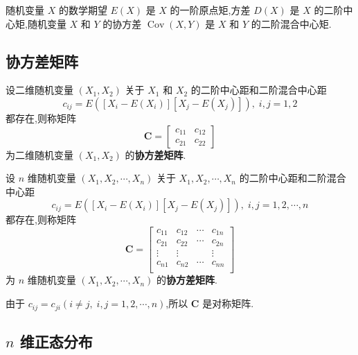 随机变量 $X$ 的数学期望 $E(X)$ 是 $X$ 的一阶原点矩,方差 $D(X)$ 是 $X$ 的二阶中心矩,随机变量 $X$ 和 $Y$ 的协方差 $\operatorname{Cov}(X,Y)$ 是 $X$ 和 $Y$ 的二阶混合中心矩.

\subsection{协方差矩阵}

\begin{definition}
    设二维随机变量 $(X_1,X_2)$ 关于 $X_1$ 和 $X_2$ 的二阶中心距和二阶混合中心距
    $$
    c_{ij} = E([X_i-E(X_i)][X_j-E(X_j)]), \; i,j=1,2
    $$
    都存在,则称矩阵
    $$
    \boldsymbol{C} = \begin{bmatrix}
        c_{11} & c_{12} \\
        c_{21} & c_{22}
    \end{bmatrix}
    $$
    为二维随机变量 $(X_1,X_2)$ 的\textbf{协方差矩阵}.

    设 $n$ 维随机变量 $(X_1,X_2,\cdots,X_n)$ 关于 $X_1,X_2,\cdots,X_n$ 的二阶中心距和二阶混合中心距
    $$
    c_{ij} = E([X_i-E(X_i)][X_j-E(X_j)]), \; i,j=1,2,\cdots,n
    $$
    都存在,则称矩阵
    $$
    \boldsymbol{C} = \begin{bmatrix}
        c_{11} & c_{12} & \cdots & c_{1n} \\
        c_{21} & c_{22} & \cdots & c_{2n} \\
        \vdots & \vdots & & \vdots \\
        c_{n1} & c_{n2} & \cdots & c_{nn} \\
    \end{bmatrix}
    $$
    为 $n$ 维随机变量 $(X_1,X_2,\cdots,X_n)$ 的\textbf{协方差矩阵}.
\end{definition}

由于 $c_{ij}=c_{ji} (i \not= j, \; i,j=1,2,\cdots,n)$,所以 $\boldsymbol{C}$ 是对称矩阵.

\subsection{\texorpdfstring{$n$}{} 维正态分布}

